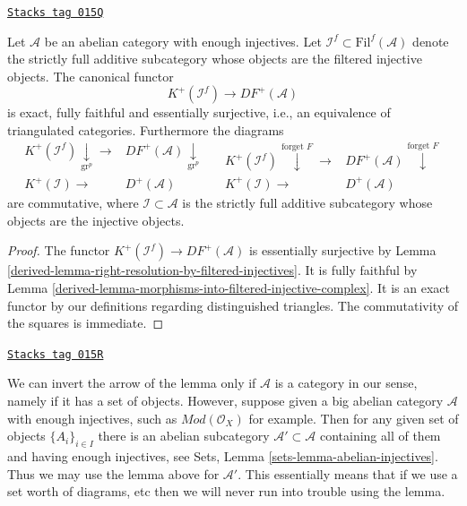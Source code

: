 \begin{lemma}
\label{derived-lemma-filtered-localization-functor}
\href{https://stacks.math.columbia.edu/tag/015Q}{\texttt{Stacks tag 015Q}}

Let $\mathcal{A}$ be an abelian category with enough injectives.
Let $\mathcal{I}^f \subset \text{Fil}^f(\mathcal{A})$
denote the strictly full additive subcategory whose objects are
the filtered injective objects. The canonical functor
$$
K^{+}(\mathcal{I}^f)
\longrightarrow
DF^{+}(\mathcal{A})
$$
is exact, fully faithful and essentially surjective, i.e., an
equivalence of triangulated categories. Furthermore the diagrams
$$
\begin{array}{cc}K^{+}(\mathcal{I}^f) \underset{\text{gr}^p}{\downarrow}\longrightarrow & DF^{+}(\mathcal{A}) \underset{\text{gr}^p}{\downarrow} \\ K^{+}(\mathcal{I}) \longrightarrow & D^{+}(\mathcal{A})\end{array}
\quad
\begin{array}{cc}K^{+}(\mathcal{I}^f) \overset{\text{forget }F}{\downarrow}\longrightarrow & DF^{+}(\mathcal{A}) \overset{\text{forget }F}{\downarrow} \\ K^{+}(\mathcal{I}) \longrightarrow & D^{+}(\mathcal{A})\end{array}
$$
are commutative, where $\mathcal{I} \subset \mathcal{A}$ is the
strictly full additive subcategory whose objects are
the injective objects.
\end{lemma}

\begin{proof}

The functor $K^{+}(\mathcal{I}^f) \to DF^{+}(\mathcal{A})$
is essentially surjective by
Lemma \ref{derived-lemma-right-resolution-by-filtered-injectives}.
It is fully faithful by
Lemma \ref{derived-lemma-morphisms-into-filtered-injective-complex}.
It is an exact functor by our definitions regarding distinguished
triangles.
The commutativity of the squares is immediate.
\end{proof}

\begin{remark}
\label{derived-remark-filtered-localization-big}
\href{https://stacks.math.columbia.edu/tag/015R}{\texttt{Stacks tag 015R}}

We can invert the arrow of the lemma
only if $\mathcal{A}$ is a category in our sense,
namely if it has a set of objects. However, suppose given a big abelian
category $\mathcal{A}$ with enough injectives, such as
$\textit{Mod}(\mathcal{O}_X)$ for example. Then for any given set of objects
$\{A_i\}_{i\in I}$ there is an abelian subcategory
$\mathcal{A}' \subset \mathcal{A}$ containing all of them
and having enough injectives, see
Sets, Lemma \ref{sets-lemma-abelian-injectives}.
Thus we may use the lemma above for $\mathcal{A}'$.
This essentially means that if we use a set worth of diagrams, etc
then we will never run into trouble using the lemma.
\end{remark}

